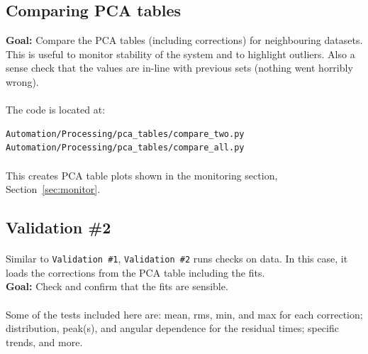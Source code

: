 \documentclass[12pt]{article}
\begin{document}
\subsection{Comparing PCA tables}\label{sub:comp_tab}
\textbf{Goal:} Compare the PCA tables (including corrections) for neighbouring datasets. This is useful to monitor stability of the system and to highlight outliers. Also a sense check that the values are in-line with previous sets (nothing went horribly wrong).

\paragraph{}
The code is located at:
\begin{lstlisting}
Automation/Processing/pca_tables/compare_two.py
Automation/Processing/pca_tables/compare_all.py
\end{lstlisting}

\paragraph{}
This creates PCA table plots shown in the monitoring section, Section~\ref{sec:monitor}.

\subsection{Validation \#2}\label{sec:val2}
\paragraph{}
Similar to \texttt{Validation \#1}, \texttt{Validation \#2} runs checks on data. In this case, it loads the corrections from the PCA table including the fits.\\
\textbf{Goal:} Check and confirm that the fits are sensible.

\paragraph{}
Some of the tests included here are: mean, rms, min, and max for each correction; distribution, peak(s), and angular dependence for  the residual times; specific trends, and more. 
\end{document}
